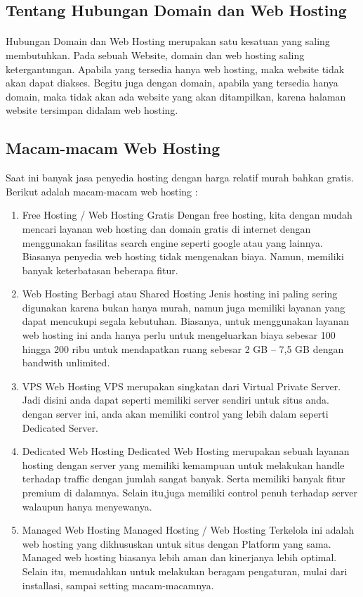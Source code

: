 \documentclass[12pt, a4paper]{article}
\begin{document}
\subsection{Tentang Hubungan Domain dan Web Hosting}
\paragraph{}Hubungan Domain dan Web Hosting merupakan satu kesatuan yang saling membutuhkan. Pada sebuah Website, domain dan web hosting saling ketergantungan. Apabila yang tersedia hanya web hosting, maka website tidak akan dapat diakses. Begitu juga dengan domain, apabila yang tersedia hanya domain, maka tidak akan ada website yang akan ditampilkan, karena halaman website tersimpan didalam web hosting.

\subsection{Macam-macam Web Hosting}
Saat ini banyak jasa penyedia hosting dengan harga relatif murah bahkan gratis. Berikut adalah macam-macam web hosting :
\begin{enumerate}
\item Free Hosting / Web Hosting Gratis
	  Dengan free hosting, kita dengan mudah mencari layanan web hosting dan domain gratis di internet dengan
	  menggunakan fasilitas search engine seperti google atau yang lainnya. Biasanya penyedia web hosting
	  tidak mengenakan biaya. Namun, memiliki banyak keterbatasan beberapa fitur.
\item Web Hosting Berbagi atau Shared Hosting
	  Jenis hosting ini paling sering digunakan karena bukan hanya murah, namun juga memiliki layanan yang
	  dapat mencukupi segala kebutuhan. Biasanya, untuk menggunakan layanan web hosting ini anda hanya perlu
	  untuk mengeluarkan
	  biaya sebesar 100 hingga 200 ribu untuk mendapatkan ruang sebesar 2 GB – 7,5 GB dengan bandwith
	  unlimited.
\item VPS Web Hosting
	  VPS merupakan singkatan dari Virtual Private Server. Jadi disini anda dapat seperti memiliki server
	  sendiri untuk situs anda. dengan server ini, anda akan memiliki control yang lebih dalam seperti
	  Dedicated Server.
\item Dedicated Web Hosting
	  Dedicated Web Hosting merupakan sebuah layanan hosting dengan server yang memiliki kemampuan untuk
	  melakukan handle terhadap traffic dengan jumlah sangat banyak. Serta memiliki banyak fitur premium di
	  dalamnya. Selain itu,juga memiliki control penuh terhadap server walaupun  hanya menyewanya.
\item Managed Web Hosting
	  Managed Hosting / Web Hosting Terkelola ini adalah web hosting yang dikhususkan untuk situs dengan
	  Platform yang sama. Managed web hosting biasanya lebih aman dan kinerjanya lebih optimal. Selain itu,
	  memudahkan untuk melakukan beragam pengaturan, mulai dari installasi, sampai setting macam-macamnya.
  \end{enumerate}
\end{document}
